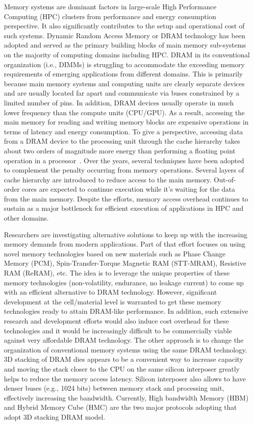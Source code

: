 Memory systems are dominant factors in large-scale High Performance Computing (HPC) clusters from performance and energy consumption perspective. It also significantly contributes to the setup and operational cost of such systems. Dynamic Random Access Memory or DRAM technology has been adopted and served as the primary building blocks of main memory sub-systems on the majority of computing domains including HPC. DRAM in its conventional organization (i.e., DIMMs) is struggling to accommodate the exceeding memory requirements of emerging applications from different domains. This is primarily because main memory systems and computing units are clearly separate devices and are usually located far apart and communicate via buses constrained by a limited number of pins. In addition, DRAM devices usually operate in much lower frequency than the compute units (CPU/GPU). As a result, accessing the main memory for reading and writing memory blocks are expensive operations in terms of latency and energy consumption. To give a perspective, accessing data from a DRAM device to the processing unit through the cache hierarchy takes about two orders of magnitude more energy than performing a floating point operation in a processor~\cite{12}. Over the years, several techniques have been adopted to complement the penalty occurring from memory operations. Several layers of cache hierarchy are introduced to reduce access to the main memory. Out-of-order cores are expected to continue execution while it's waiting for the data from the main memory. Despite the efforts, memory access overhead continues to sustain as a major bottleneck for efficient execution of applications in HPC and other domains.

Researchers are investigating alternative solutions to keep up with the increasing memory demands from modern applications. Part of that effort focuses on using novel memory technologies based on new materials such as Phase Change Memory (PCM), Spin-Transfer-Torque Magnetic RAM (STT-MRAM), Resistive RAM (ReRAM), etc. The idea is to leverage the unique properties of these memory technologies (non-volatility, endurance, no leakage current) to come up with an efficient alternative to DRAM technology. However, significant development at the cell/material level is warranted to get these memory technologies ready to attain DRAM-like performance. In addition, such extensive research and development efforts would also induce cost overhead for these technologies and it would be increasingly difficult to be commercially viable against very affordable DRAM technology.   
The other approach is to change the organization of conventional memory systems using the same DRAM technology. 3D stacking of DRAM dies appears to be a convenient way to increase capacity and moving the stack closer to the CPU on the same silicon interposer greatly helps to reduce the memory access latency. Silicon interposer also allows to have denser buses (e.g., 1024 bits) between memory stack and processing unit, effectively increasing the bandwidth. Currently, High bandwidth Memory (HBM) and Hybrid Memory Cube (HMC) are the two major protocols adopting that adopt 3D stacking DRAM model.        

